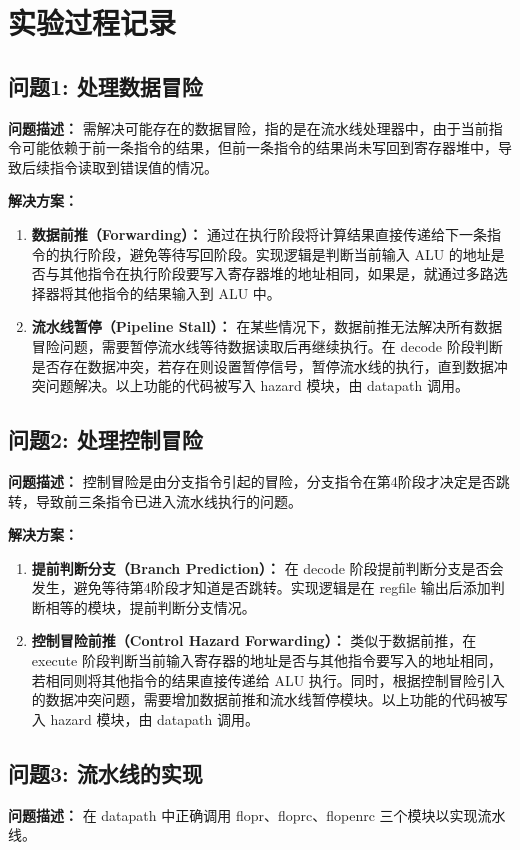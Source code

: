 \section{实验过程记录}

\subsection{问题1: 处理数据冒险}
\textbf{问题描述：} 需解决可能存在的数据冒险，指的是在流水线处理器中，由于当前指令可能依赖于前一条指令的结果，但前一条指令的结果尚未写回到寄存器堆中，导致后续指令读取到错误值的情况。

\textbf{解决方案：}
\begin{enumerate}
    \item \textbf{数据前推（Forwarding）：} 通过在执行阶段将计算结果直接传递给下一条指令的执行阶段，避免等待写回阶段。实现逻辑是判断当前输入 ALU 的地址是否与其他指令在执行阶段要写入寄存器堆的地址相同，如果是，就通过多路选择器将其他指令的结果输入到 ALU 中。
    \item \textbf{流水线暂停（Pipeline Stall）：} 在某些情况下，数据前推无法解决所有数据冒险问题，需要暂停流水线等待数据读取后再继续执行。在 decode 阶段判断是否存在数据冲突，若存在则设置暂停信号，暂停流水线的执行，直到数据冲突问题解决。以上功能的代码被写入 hazard 模块，由 datapath 调用。
\end{enumerate}

\subsection{问题2: 处理控制冒险}
\textbf{问题描述：} 控制冒险是由分支指令引起的冒险，分支指令在第4阶段才决定是否跳转，导致前三条指令已进入流水线执行的问题。

\textbf{解决方案：}
\begin{enumerate}
    \item \textbf{提前判断分支（Branch Prediction）：} 在 decode 阶段提前判断分支是否会发生，避免等待第4阶段才知道是否跳转。实现逻辑是在 regfile 输出后添加判断相等的模块，提前判断分支情况。
    \item \textbf{控制冒险前推（Control Hazard Forwarding）：} 类似于数据前推，在 execute 阶段判断当前输入寄存器的地址是否与其他指令要写入的地址相同，若相同则将其他指令的结果直接传递给 ALU 执行。同时，根据控制冒险引入的数据冲突问题，需要增加数据前推和流水线暂停模块。以上功能的代码被写入 hazard 模块，由 datapath 调用。
\end{enumerate}

\subsection{问题3: 流水线的实现}
\textbf{问题描述：} 在 datapath 中正确调用 flopr、floprc、flopenrc 三个模块以实现流水线。

